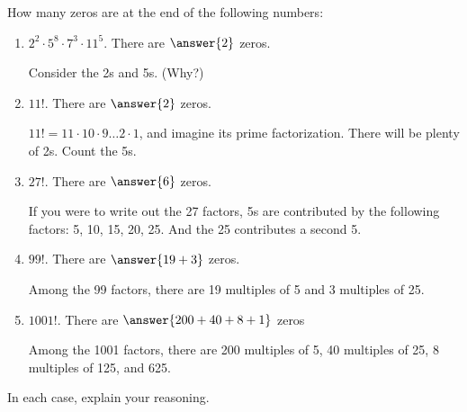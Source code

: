 \documentclass[nooutcomes]{ximera}
\begin{document}
\begin{problem}
How many zeros are at the end of the following numbers:
\begin{enumerate}
\item $2^2 \cdot 5^8 \cdot 7^3\cdot 11^5$. There are $\answer{2}$ zeros. 	\begin{hint}Consider the 2s and 5s.  (Why?)\end{hint}
\item $11!$. There are $\answer{2}$ zeros.
\begin{hint}$11! = 11\cdot10\cdot9\dots2\cdot1$, and imagine its prime factorization.  There will be plenty of 2s. Count the 5s.\end{hint}
\item $27!$. There are $\answer{6}$ zeros.
 \begin{hint}If you were to write out the 27 factors, 5s are contributed by the following factors:  5, 10, 15, 20, 25.  And the 25 contributes a second 5.\end{hint}
\item $99!$. There are $\answer{19+3}$ zeros. 
  \begin{hint}Among the 99 factors, there are 19 multiples of 5 and 3 multiples of 25.\end{hint}
\item $1001!$. There are $\answer{200+40+8+1}$ zeros
  \begin{hint}Among the 1001 factors, there are 200 multiples of 5, 40 multiples of 25, 8 multiples of 125, and 625.\end{hint}
\end{enumerate}
In each case, explain your reasoning.
\end{problem}
\end{document}

